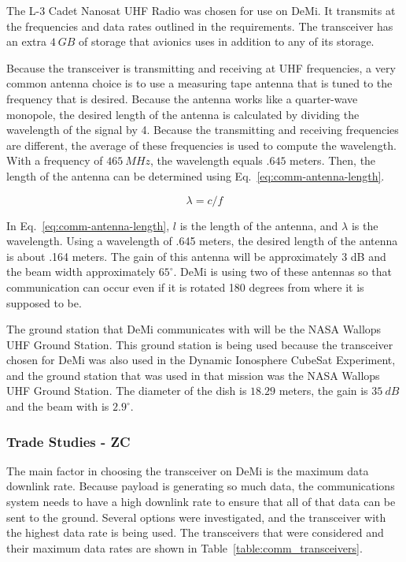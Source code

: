 \documentclass[12pt]{article}
\begin{document}
The L-3 Cadet Nanosat UHF Radio was chosen for use on DeMi. It transmits at the frequencies and data rates outlined in the requirements. The transceiver has an extra $4\ GB$ of storage that avionics uses in addition to any of its storage. 

Because the transceiver is transmitting and receiving at UHF frequencies, a very common antenna choice is to use a measuring tape antenna that is tuned to the frequency that is desired. Because the antenna works like a quarter-wave monopole, the desired length of the antenna is calculated by dividing the wavelength of the signal by 4. Because the transmitting and receiving frequencies are different, the average of these frequencies is used to compute the wavelength. With a frequency of $465\ MHz$, the wavelength equals $.645$ meters. Then, the length of the antenna can be determined using Eq.~\ref{eq:comm-antenna-length}.


\begin{equation}\label{eq:comm-antenna-length}
\lambda = c/f
\end{equation}

In Eq.~\ref{eq:comm-antenna-length}, $l$ is the length of the antenna, and $\lambda$ is the wavelength.
Using a wavelength of .645 meters, the desired length of the antenna is about .164 meters. The
gain of this antenna will be approximately 3 dB and the beam width approximately $65^\circ$. DeMi is
using two of these antennas so that communication can occur even if it is rotated 180 degrees
from where it is supposed to be.

The ground station that DeMi communicates with will be the NASA Wallops UHF Ground Station. This ground station is being used because the transceiver chosen for DeMi was also used in the Dynamic Ionosphere CubeSat Experiment, and the ground station that was used in that mission was the NASA Wallops UHF Ground Station. The diameter of the dish is $18.29$ meters, the gain is $35\ dB$ and the beam with is $2.9^\circ$.


\subsubsection{Trade Studies - ZC} \label{sec:communications-trade-studies}

The main factor in choosing the transceiver on DeMi is the maximum data downlink rate. Because payload is generating so much data, the communications system needs to have a high downlink rate to ensure that all of that data can be sent to the ground. Several options were investigated, and the transceiver with the highest data rate is being used. The transceivers that were considered and their maximum data rates are shown in Table~\ref{table:comm_transceivers}.
\end{document}
